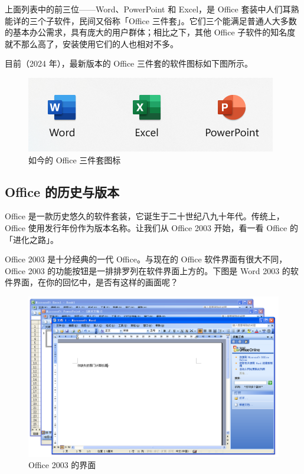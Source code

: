 上面列表中的前三位——Word、PowerPoint 和 Excel，是 Office 套装中人们耳熟能详的三个子软件，民间又俗称「Office 三件套」。它们三个能满足普通人大多数的基本办公需求，具有庞大的用户群体；相比之下，其他 Office 子软件的知名度就不那么高了，安装使用它们的人也相对不多。

目前（2024 年），最新版本的 Office 三件套的软件图标如下图所示。

\begin{figure}[htb!]
  \centering
  \includegraphics[width=.5\textwidth]{assets/software/Office_icons.png}
  \caption{如今的 Office 三件套图标}
  \label{fig:Office_icons}
\end{figure}
\vspace*{-1cm}

\subsection{Office 的历史与版本}

Office 是一款历史悠久的软件套装，它诞生于二十世纪八九十年代。传统上，Office 使用发行年份作为版本名称。让我们从 Office 2003 开始，看一看 Office 的「进化之路」。

Office 2003 是十分经典的一代 Office。与现在的 Office 软件界面有很大不同，Office 2003 的功能按钮是一排排罗列在软件界面上方的。下图是 Word 2003 的软件界面，在你的回忆中，是否有这样的画面呢？

\begin{figure}[htb!]
  \centering
  \includegraphics[width=.83\textwidth]{assets/software/Office_2003.png}
  \caption{Office 2003 的界面}
  \label{fig:Office_2003}
\end{figure}


